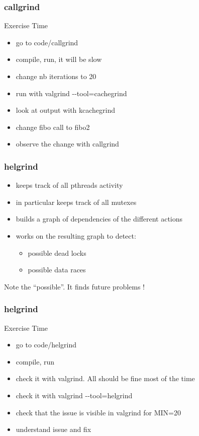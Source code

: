 \begin{frame}[fragile]
  \frametitle{callgrind}
  \begin{alertblock}{Exercise Time}
    \begin{itemize}
    \item go to code/callgrind
    \item compile, run, it will be slow
    \item change nb iterations to 20
    \item run with valgrind -{}-tool=cachegrind
    \item look at output with kcachegrind
    \item change fibo call to fibo2
    \item observe the change with callgrind
    \end{itemize}
  \end{alertblock}
\end{frame}

\begin{frame}[fragile]
  \frametitle{helgrind}
  \begin{block}{}
    \begin{itemize}
      \item keeps track of all pthreads activity
      \item in particular keeps track of all mutexes
      \item builds a graph of dependencies of the different actions
      \item works on the resulting graph to detect:
        \begin{itemize}
        \item possible dead locks
        \item possible data races
        \end{itemize}
    \end{itemize}
  \end{block}
  \pause
  \begin{alertblock}{}
    Note the ``possible''. It finds future problems !
  \end{alertblock}
\end{frame}

\begin{frame}[fragile]
  \frametitle{helgrind}
  \begin{alertblock}{Exercise Time}
    \begin{itemize}
    \item go to code/helgrind
    \item compile, run
    \item check it with valgrind. All should be fine most of the time
    \item check it with valgrind -{}-tool=helgrind
    \item check that the issue is visible in valgrind for MIN=20
    \item understand issue and fix
    \end{itemize}
  \end{alertblock}
\end{frame}



